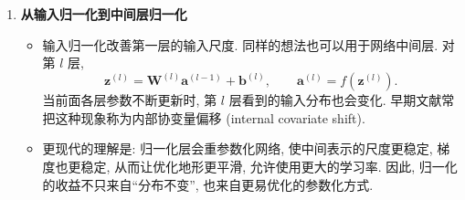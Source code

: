 \documentclass{../nndlcourse}
\begin{document}
\begin{enumerate}
\begin{itemize}
      \[
        \tilde{\boldsymbol{x}}
        =
        \boldsymbol{\Lambda}^{-\frac{1}{2}}
        \boldsymbol{U}^{\top}
        (\boldsymbol{x}-\boldsymbol{\mu}).
      \]
      这里可以把两步分开理解. 先令
      \[
        \boldsymbol{z}
        =
        \boldsymbol{U}^{\top}
        (\boldsymbol{x}-\boldsymbol{\mu}),
      \]
      相当于把坐标轴旋转到数据方差最大的主方向上. 由于
      \[
        \operatorname{Cov}(\boldsymbol{z})
        =
        \boldsymbol{U}^{\top}\boldsymbol{\Sigma}\boldsymbol{U}
        =
        \boldsymbol{\Lambda},
      \]
      新坐标下的协方差矩阵是对角矩阵, 不同主方向之间的二阶相关性就被消掉了; 第 $i$ 个方向的方差为 $\lambda_i$. 再乘以 $\boldsymbol{\Lambda}^{-1/2}$, 就是在第 $i$ 个主方向上除以标准差 $\sqrt{\lambda_i}$, 因而
      \[
        \operatorname{Cov}(\tilde{\boldsymbol{x}})
        =
        \boldsymbol{\Lambda}^{-\frac{1}{2}}
        \boldsymbol{\Lambda}
        \boldsymbol{\Lambda}^{-\frac{1}{2}}
        =
        \boldsymbol{I}.
      \]
      这说明在理想估计下, 白化后的各主方向方差都变为 $1$, 方向之间的协方差变为 $0$. 这里说“更接近”和“降低”, 是因为实际数据有限、协方差估计有误差, 实现中还常把 $\boldsymbol{\Lambda}^{-1/2}$ 写成 ${\left(\boldsymbol{\Lambda}+\epsilon\boldsymbol{I}\right)}^{-\frac{1}{2}}$ 来避免小特征值导致数值不稳定. 需要注意, 白化只消除了二阶相关性, 并不保证非高斯特征之间完全独立; 而且它需要估计和分解协方差矩阵, 计算和数值代价都高. 在很多深度学习任务中, 对输入做标准化已经足够.
      \item 验证集和测试集必须使用训练集上的 $\mu_j,\sigma_j$ 或最大最小值. 若重新使用验证集或测试集自身统计量, 就把评估数据的信息泄漏进了预处理过程.
    \end{itemize}
  \item \textbf{从输入归一化到中间层归一化}
    \begin{itemize}
      \item 输入归一化改善第一层的输入尺度. 同样的想法也可以用于网络中间层. 对第 $l$ 层,
      \[
        \boldsymbol{z}^{(l)}
        =
        \boldsymbol{W}^{(l)}\boldsymbol{a}^{(l-1)}
        +
        \boldsymbol{b}^{(l)},
        \qquad
        \boldsymbol{a}^{(l)}
        =
        f\left(\boldsymbol{z}^{(l)}\right).
      \]
      当前面各层参数不断更新时, 第 $l$ 层看到的输入分布也会变化. 早期文献常把这种现象称为内部协变量偏移 (internal covariate shift).
      \item 更现代的理解是: 归一化层会重参数化网络, 使中间表示的尺度更稳定, 梯度也更稳定, 从而让优化地形更平滑, 允许使用更大的学习率. 因此, 归一化的收益不只来自“分布不变”, 也来自更易优化的参数化方式.

\end{itemize}
\end{enumerate}
\end{document}
